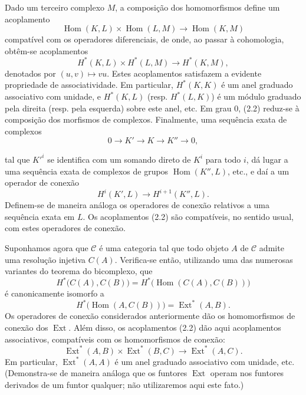 \documentclass[11pt,twoside,openany]{book}
\numberwithin{equation}{section}
\newcommand{\src}[1]{%
  \phantomsection\hypertarget{src:#1}{}%
  \marginpar{\raggedleft\footnotesize\sffamily #1}%
}
\newcommand{\Ccat}{\mathcal C}
\theoremstyle{plain}
\theoremstyle{definition}
\theoremstyle{remark}
\newcommand{\FgaUnitKey}{frontmatter}
\renewcommand{\src}[1]{%
  \phantomsection\hypertarget{src:\FgaUnitKey:#1}{}%
  \marginpar{\raggedleft\footnotesize\sffamily #1}%
}
\begin{document}
Dado um terceiro complexo $M$, a composição dos homomorfismos
define um acoplamento
\[
  \operatorname{Hom}(K,L)\times\operatorname{Hom}(L,M)
  \longrightarrow\operatorname{Hom}(K,M)
\]
compatível com os operadores diferenciais, de onde, ao passar à cohomologia,
obtêm-se acoplamentos
\begin{equation}\tag{2.2}
  H^{*}(K,L)\times H^{*}(L,M)\longrightarrow H^{*}(K,M),
\end{equation}
denotados por $(u,v)\longmapsto vu$. Estes acoplamentos satisfazem a evidente propriedade
de associatividade. Em particular, $H^{*}(K,K)$ é um anel graduado associativo
com unidade, e $H^{*}(K,L)$ (resp. $H^{*}(L,K)$) é um módulo graduado pela direita
(resp. pela esquerda) sobre este anel, etc. Em grau $0$, (2.2) reduz-se à
composição dos morfismos de complexos. Finalmente, uma sequência exata de
complexos
\[
  0\longrightarrow K'\longrightarrow K\longrightarrow K''\longrightarrow 0,
\]
\src{172}
tal que $K'^{i}$ se identifica com um somando direto de $K^{i}$ para todo $i$,
dá lugar a uma sequência exata de complexos de grupos
$\operatorname{Hom}(K'',L)$, etc., e daí a um operador de conexão
\[
  H^{i}(K',L)\longrightarrow H^{i+1}(K'',L).
\]
Definem-se de maneira análoga os operadores de conexão relativos a uma sequência exata em $L$. Os
acoplamentos (2.2) são compatíveis, no sentido usual, com estes operadores de conexão.

Suponhamos agora que $\Ccat$ é uma categoria tal que todo objeto $A$
de $\Ccat$ admite uma resolução injetiva $C(A)$. Verifica-se então, utilizando
uma das numerosas variantes do teorema do bicomplexo, que
\[
  H^{*}\bigl(C(A),C(B)\bigr)
  =H^{*}\bigl(\operatorname{Hom}(C(A),C(B))\bigr)
\]
é canonicamente isomorfo a
\[
  H^{*}\bigl(\operatorname{Hom}(A,C(B))\bigr)
  =\operatorname{Ext}^{*}(A,B).
\]
Os operadores de conexão considerados anteriormente dão os homomorfismos de conexão dos
$\operatorname{Ext}$. Além disso, os acoplamentos (2.2) dão aqui
acoplamentos associativos, compatíveis com os homomorfismos de conexão:
\begin{equation}\tag{2.3}
  \operatorname{Ext}^{*}(A,B)\times\operatorname{Ext}^{*}(B,C)
  \longrightarrow\operatorname{Ext}^{*}(A,C).
\end{equation}
Em particular, $\operatorname{Ext}^{*}(A,A)$ é um anel graduado associativo
com unidade, etc. (Demonstra-se de maneira análoga que os funtores
$\operatorname{Ext}$ operam nos funtores derivados de um funtor
qualquer; não utilizaremos aqui este fato.)
\end{document}

